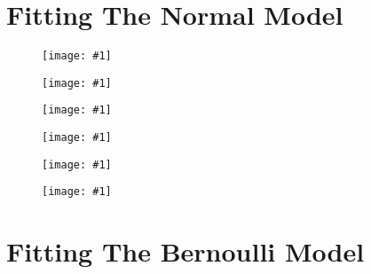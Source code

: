 \documentclass{article}
\def\beginmyfig{\begin{figure}[htbp]\begin{center}}
\def\endmyfig{\end{center}\end{figure}}
\def\myfig#1#2{\beginmyfig\texttt{[image: \#1]}\caption{#2}\endmyfig}
\begin{document}
\section{Fitting The Normal Model}
\myfig{images/apost.pdf}{}
\myfig{images/bpost.pdf}{}
\myfig{images/gpost.pdf}{}
\myfig{images/sy2post.pdf}{}
\myfig{images/sa2post.pdf}{}
\myfig{images/au.pdf}{}

\section{Fitting The Bernoulli Model}
\end{document}

